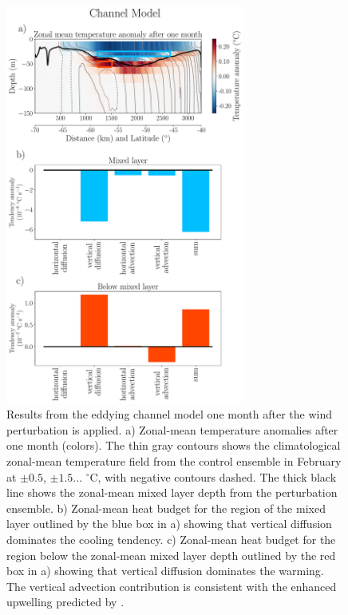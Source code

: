 \documentclass{ametsocV5}
\begin{document}
\begin{figure}[!ht]
    \begin{center}
        \includegraphics[width=0.7\textwidth]{figures/channel_model_zonal_mean_one_month_with_heat_budget.pdf}
        \caption{Results from the eddying channel model one month after the wind perturbation is applied. a) Zonal-mean temperature anomalies after one month (colors). The thin gray contours shows the climatological zonal-mean temperature field from the control ensemble in February at $\pm0.5$, $\pm1.5 \dots$ $^{\circ}$C, with negative contours dashed. The thick black line shows the zonal-mean mixed layer depth from the perturbation ensemble. b) Zonal-mean heat budget for the region of the mixed layer outlined by the blue box in a) showing that vertical diffusion dominates the cooling tendency. c) Zonal-mean heat budget for the region below the zonal-mean mixed layer depth outlined by the red box in a) showing that vertical diffusion dominates the warming. The vertical advection contribution is consistent with the enhanced upwelling predicted by \citet{Purich2016}.}
        \label{fig:channel_model_zonal_mean_one_month_with_heat_budget}
    \end{center}
\end{figure}
\end{document}
